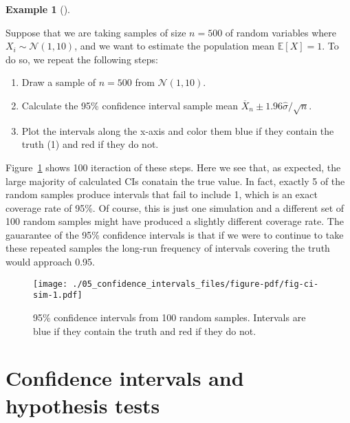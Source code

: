 \documentclass[
  letterpaper,
  DIV=11,
  numbers=noendperiod]{scrreprt}
\providecommand{\tightlist}{%
  \setlength{\itemsep}{0pt}\setlength{\parskip}{0pt}}\usepackage{longtable,booktabs,array}
\newcommand{\E}{\mathbb{E}}
\newcommand{\N}{\mathcal{N}}
\newcommand{\Xbar}{\overline{X}}
\theoremstyle{definition}
\theoremstyle{plain}
\theoremstyle{definition}
\newtheorem{example}{Example}[chapter]
\theoremstyle{remark}
\begin{document}
\leavevmode{}%
\begin{example}[]\label{exm-cis}

Suppose that we are taking samples of size \(n=500\) of random variables
where \(X_i \sim \N(1, 10)\), and we want to estimate the population
mean \(\E[X] = 1\). To do so, we repeat the following steps:

\begin{enumerate}
\def\labelenumi{\arabic{enumi}.}
\tightlist
\item
  Draw a sample of \(n=500\) from \(\N(1, 10)\).
\item
  Calculate the 95\% confidence interval sample mean
  \(\Xbar_n \pm 1.96\widehat{\sigma}/\sqrt{n}\).
\item
  Plot the intervals along the x-axis and color them blue if they
  contain the truth (1) and red if they do not.
\end{enumerate}

Figure~\ref{fig-ci-sim} shows 100 iteraction of these steps. Here we see
that, as expected, the large majority of calculated CIs conatain the
true value. In fact, exactly 5 of the random samples produce intervals
that fail to include 1, which is an exact coverage rate of 95\%. Of
course, this is just one simulation and a different set of 100 random
samples might have produced a slightly different coverage rate. The
gauarantee of the 95\% confidence intervals is that if we were to
continue to take these repeated samples the long-run frequency of
intervals covering the truth would approach 0.95.

\begin{figure}

{\centering \texttt{[image: ./05\_confidence\_intervals\_files/figure-pdf/fig-ci-sim-1.pdf]}

}

\caption{\label{fig-ci-sim}95\% confidence intervals from 100 random
samples. Intervals are blue if they contain the truth and red if they do
not.}

\end{figure}

\end{example}

\hypertarget{confidence-intervals-and-hypothesis-tests}{%
\section{Confidence intervals and hypothesis
tests}\label{confidence-intervals-and-hypothesis-tests}}
\end{document}
